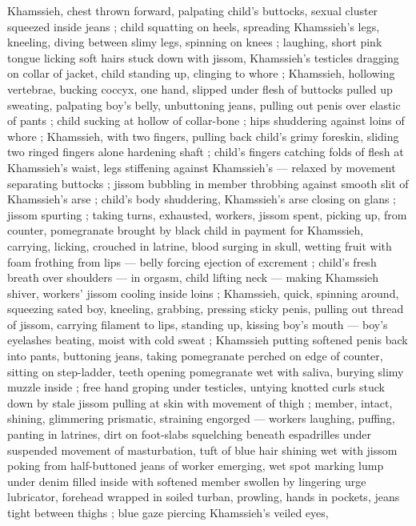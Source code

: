 Khamssieh, chest thrown forward, palpating child's buttocks, sexual cluster squeezed inside jeans ;
child squatting on heels, spreading Khamssieh's legs, kneeling, diving between slimy legs, spinning
on knees ; laughing, short pink tongue licking soft hairs stuck down with jissom, Khamssieh's
testicles dragging on collar of jacket, child standing up, clinging to whore ; Khamssieh, hollowing
vertebrae, bucking coccyx, one hand, slipped under flesh of buttocks pulled up sweating, palpating
boy's belly, unbuttoning jeans, pulling out penis over elastic of pants ; child sucking at hollow of
collar-bone ; hips shuddering against loins of whore ; Khamssieh, with two fingers, pulling back
child's grimy foreskin, sliding two ringed fingers alone hardening shaft ; child's fingers catching
folds of flesh at Khamssieh's waist, legs stiffening against Khamssieh's --- relaxed by movement
separating buttocks ; jissom bubbling in member throbbing against smooth slit of Khamssieh's arse ;
child's body shuddering, Khamssieh's arse closing on glans ; jissom spurting ; taking turns,
exhausted, workers, jissom spent, picking up, from counter, pomegranate brought by black child in
payment for Khamssieh, carrying, licking, crouched in latrine, blood surging in skull, wetting fruit
with foam frothing from lips --- belly forcing ejection of excrement ; child's fresh breath over
shoulders --- in orgasm, child lifting neck --- making Khamssieh shiver, workers' jissom cooling
inside loins ; Khamssieh, quick, spinning around, squeezing sated boy, kneeling, grabbing, pressing
sticky penis, pulling out thread of jissom, carrying filament to lips, standing up, kissing boy's
mouth --- boy's eyelashes beating, moist with cold sweat ; Khamssieh putting softened penis back
into pants, buttoning jeans, taking pomegranate perched on edge of counter, sitting on %
step-ladder, teeth opening pomegranate wet with saliva, burying slimy muzzle inside ; free hand
groping under testicles, untying knotted curls stuck down by stale jissom pulling at skin with
movement of thigh ; member, intact, shining, glimmering prismatic, straining engorged --- workers
laughing, puffing, panting in latrines, dirt on foot-slabs squelching beneath espadrilles under
suspended movement of masturbation, tuft of blue hair shining wet with jissom poking from
half-buttoned jeans of worker emerging, wet spot marking lump under denim filled inside with
softened member swollen by lingering urge {\dashsemi} lubricator, forehead wrapped in soiled turban,
prowling, hands in pockets, jeans tight between thighs ; blue gaze piercing Khamssieh's veiled eyes,
